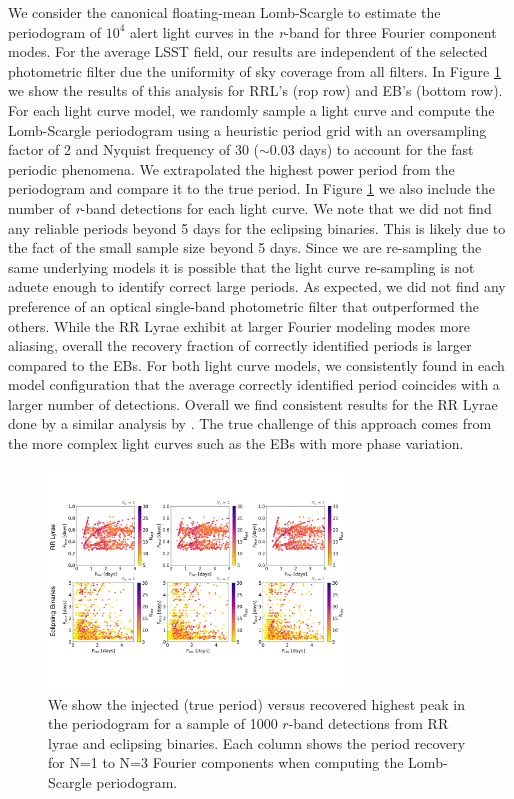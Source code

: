 \documentclass[DM,authoryear,toc]{lsstdoc}
\begin{document}
We consider the canonical floating-mean Lomb-Scargle to estimate the periodogram of $10^4$ alert light curves in the \textit{r}-band for three Fourier component modes. For the average LSST field, our results are independent of the selected photometric filter due the uniformity of sky coverage from all filters. In Figure \ref{fig:single_band_lsp} we show the results of this analysis for RRL's (rop row) and EB's (bottom row). For each light curve model, we randomly sample a light curve and compute the Lomb-Scargle periodogram using a heuristic period grid with an oversampling factor of 2 and Nyquist frequency of 30 ($\sim$0.03 days) to account for the fast periodic phenomena. We extrapolated the highest power period from the periodogram and compare it to the true period. In Figure \ref{fig:single_band_lsp} we also include the number of \textit{r}-band detections for each light curve. We note that we did not find any reliable periods beyond 5 days for the eclipsing binaries. This is likely due to the fact of the small sample size beyond 5 days. Since we are re-sampling the same underlying models it is possible that the light curve re-sampling is not aduete enough to identify correct large periods. As expected, we did not find any preference of an optical single-band photometric filter that outperformed the others. While the RR Lyrae exhibit at larger Fourier modeling modes more aliasing, overall the recovery fraction of correctly identified periods is larger compared to the EBs. For both light curve models, we consistently found in each model configuration that the average correctly identified period coincides with a larger number of detections. Overall we find consistent results for the RR Lyrae done by a similar analysis by \citet{VanderPlas:VP2015}. The true challenge of this approach comes from the more complex light curves such as the EBs with more phase variation. 

\begin{figure}
  \includegraphics[width=0.7\textwidth]{figures/singleband_lsp.pdf}
  \centering 
  \caption{We show the injected (true period) versus recovered highest peak in the periodogram for a sample of 1000 $r$-band detections from RR lyrae and eclipsing binaries. Each column shows the period recovery for N=1 to N=3 Fourier components when computing the Lomb-Scargle periodogram.}
  \label{fig:single_band_lsp}
\end{figure}
\end{document}
